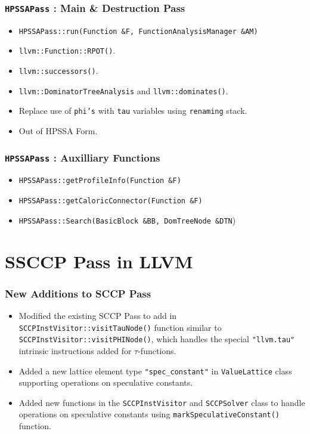 \documentclass{beamer}
\begin{document}
\begin{frame}
	\frametitle{\texttt{HPSSAPass} : Main \& Destruction Pass}
	\begin{itemize}
		\item \texttt{HPSSAPass::run(Function \&F, FunctionAnalysisManager \&AM)} 
		\item \texttt{llvm::Function::RPOT()}.
		\item \texttt{llvm::successors()}.
		\item \texttt{llvm::DominatorTreeAnalysis} and \texttt{llvm::dominates()}.
		\item Replace use of \texttt{phi's} with \texttt{tau} variables using \texttt{renaming} stack.
		\item Out of HPSSA Form. 
	\end{itemize}
\end{frame}

\begin{frame}
	\frametitle{\texttt{HPSSAPass} : Auxilliary Functions}
	\begin{itemize}
		\item \texttt{HPSSAPass::getProfileInfo(Function \&F)}
		\item \texttt{HPSSAPass::getCaloricConnector(Function \&F)}
		\item \texttt{HPSSAPass::Search(BasicBlock \&BB, DomTreeNode \&DTN})
	\end{itemize}
\end{frame}

\section{SSCCP Pass in LLVM}

\begin{frame}
	\frametitle{New Additions to SCCP Pass}
	\begin{itemize}
		\item Modified the existing SCCP Pass to add in \texttt{SCCPInstVisitor::visitTauNode()} function similar to \texttt{SCCPInstVisitor::visitPHINode()}, which handles the special \texttt{"llvm.tau"} intrinsic instructions added for $\tau$-functions.
		\item Added a new lattice element type \texttt{"spec_constant"} in \texttt{ValueLattice} class supporting operations on speculative constants. 
		\item Added new functions in the \texttt{SCCPInstVisitor} and \texttt{SCCPSolver} class to handle operations on speculative constants using \texttt{markSpeculativeConstant()} function.
	\end{itemize}
\end{frame}
\end{document}
